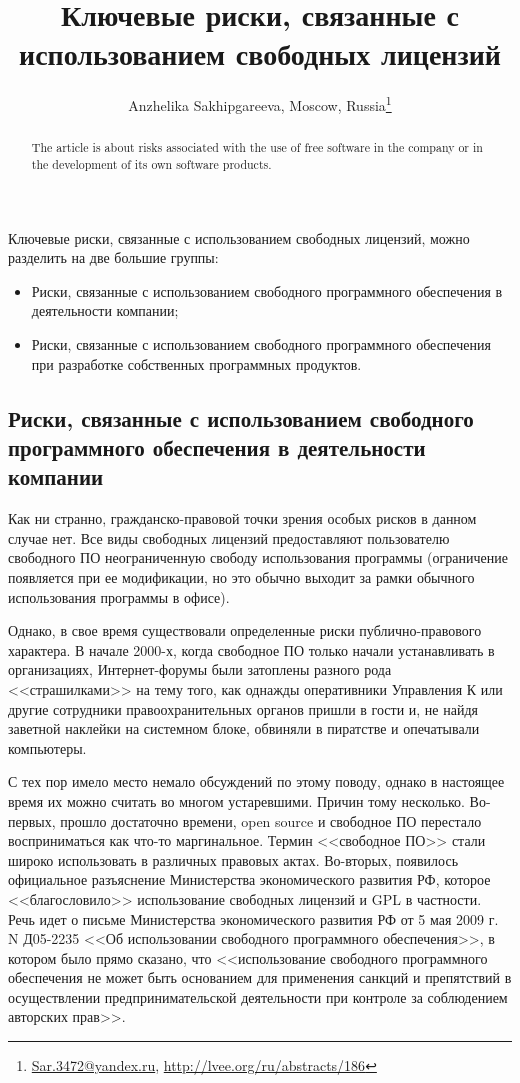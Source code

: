 \documentclass[10pt, a5paper]{article}
\begin{document}
\title{Ключевые риски, связанные с использованием свободных лицензий}
\author{Anzhelika Sakhipgareeva, Moscow, Russia\footnote{\url{Sar.3472@yandex.ru}, \url{http://lvee.org/ru/abstracts/186}}}
\maketitle
\begin{abstract}
The article is about risks associated with the use of free software in the company or in the development of its own software products.
\end{abstract}

Ключевые риски, связанные с использованием свободных лицензий, можно разделить на две большие группы:

\begin{itemize}
  \item Риски, связанные с использованием свободного программного обеспечения в деятельности компании;
  \item Риски, связанные с использованием свободного программного обеспечения при разработке собственных программных продуктов.
\end{itemize}

\subsection*{Риски, связанные с использованием свободного программного обеспечения в деятельности компании}

Как ни странно, гражданско-правовой точки зрения особых рисков в данном случае нет. Все виды свободных лицензий предоставляют пользователю свободного ПО неограниченную свободу использования программы (ограничение появляется при ее модификации, но это обычно выходит за рамки обычного использования программы в офисе).

Однако, в свое время существовали определенные риски \linebreak публично-правового характера. В начале 2000-х, когда свободное ПО только начали устанавливать в организациях, Интернет-форумы были затоплены разного рода <<страшилками>> на тему того, как однажды оперативники Управления К или другие сотрудники правоохранительных органов пришли в гости и, не найдя заветной наклейки на системном блоке, обвиняли в пиратстве и опечатывали компьютеры.

С тех пор имело место немало обсуждений по этому поводу, однако в настоящее время их можно считать во многом устаревшими. Причин тому несколько. Во-первых, прошло достаточно времени, open source и свободное ПО перестало восприниматься как что-то маргинальное. Термин <<свободное ПО>> стали широко использовать в различных правовых актах. Во-вторых, появилось официальное разъяснение Министерства экономического развития РФ, которое <<благословило>> использование свободных лицензий и GPL в частности. Речь идет о письме Министерства экономического развития РФ от 5 мая 2009 г. N Д05-2235 <<Об использовании свободного программного обеспечения>>, в котором было прямо сказано, что <<использование свободного программного обеспечения не может быть основанием для применения санкций и препятствий в осуществлении предпринимательской деятельности при контроле за соблюдением авторских прав>>.
\end{document}
